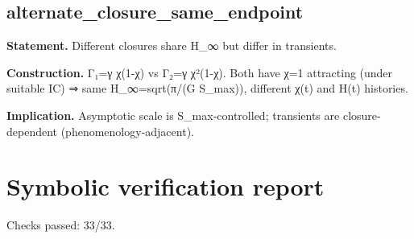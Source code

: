 \documentclass[11pt,a4paper]{article}
\theoremstyle{remark}\newtheorem*{caution}{Caution}
\begin{document}
\subsection{alternate\_closure\_same\_endpoint}
\textbf{Statement.} Different closures share H\_∞ but differ in transients.
\par\textbf{Construction.} Γ₁=γ χ(1-χ) vs Γ₂=γ χ²(1-χ). Both have χ=1 attracting (under suitable IC) ⇒ same H\_∞=sqrt(π/(G S\_max)), different χ(t) and H(t) histories.
\par\textbf{Implication.} Asymptotic scale is S\_max-controlled; transients are closure-dependent (phenomenology-adjacent).
\section{Symbolic verification report}
Checks passed: 33/33.
\end{document}
